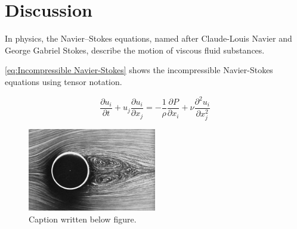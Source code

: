 \section{Discussion}

In physics, the Navier–Stokes equations, named after Claude-Louis Navier and George Gabriel Stokes, describe the motion of viscous fluid substances.

\autoref{eq:Incompressible Navier-Stokes} shows the incompressible Navier-Stokes equations using tensor notation.

\begin{equation}
    \frac{\partial u_i}{\partial t} + u_j \frac{\partial u_i}{\partial x_j} = -\frac{1}{\rho} \frac{\partial P}{\partial x_i} + \nu \frac{\partial^2 u_i}{\partial x_j^2}
    \label{eq:Incompressible Navier-Stokes}
\end{equation}

\begin{figure}[H]
    \centering
    \includegraphics[width=0.5\textwidth]{Images/CylinderImage.jpg}
    \caption[Caption used in list of tables]{Caption written below figure.}
    \label{fig:flow around cylinder}
\end{figure}

